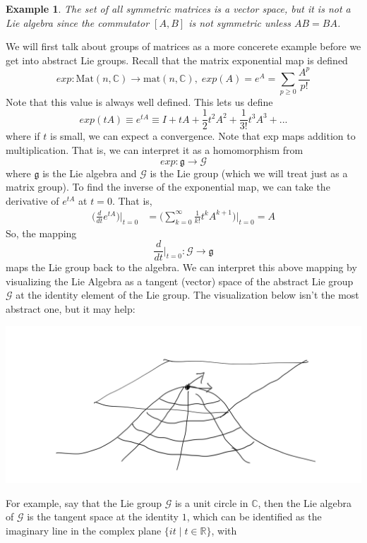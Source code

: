\documentclass{article}
\newtheorem{example}{Example}[section]
\theoremstyle{remark}
\theoremstyle{definition}
\begin{document}
\begin{example}
The set of all symmetric matrices is a vector space, but it is \textit{not} a Lie algebra since the commutator $[A,B]$ is not symmetric unless $A B = B A$. 
\end{example}

We will first talk about groups of matrices as a more concerete example before we get into abstract Lie groups. Recall that the matrix exponential map is defined
\[exp: \text{Mat}(n, \mathbb{C}) \longrightarrow \text{mat}(n, \mathbb{C}), \; exp(A) = e^A = \sum_{p \geq 0} \frac{A^p}{p!}\]
Note that this value is always well defined. This lets us define
\[exp(t A) \equiv e^{t A} \equiv I + tA + \frac{1}{2} t^2 A^2 + \frac{1}{3!} t^3 A^3 + ... \]
where if $t$ is small, we can expect a convergence. Note that exp maps addition to multiplication. That is, we can interpret it as a homomorphism from 
\[exp: \mathfrak{g} \longrightarrow \mathcal{G}\]
where $\mathfrak{g}$ is the Lie algebra and $\mathcal{G}$ is the Lie group (which we will treat just as a matrix group). To find the inverse of the exponential map, we can take the derivative of $e^{tA}$ at $t=0$. That is, 
\begin{align*}
    \bigg(\frac{d}{d t} e^{tA} \bigg) \bigg|_{t=0} & = \bigg(\sum_{k=0}^\infty \frac{1}{k!} t^k A^{k+1} \bigg) \bigg|_{t=0} = A
\end{align*}
So, the mapping
\[\frac{d}{dt} \bigg|_{t=0}: \mathcal{G} \longrightarrow \mathfrak{g}\]
maps the Lie group back to the algebra. We can interpret this above mapping by visualizing the Lie Algebra as a tangent (vector) space of the abstract Lie group $\mathcal{G}$ at the identity element of the Lie group. The visualization below isn't the most abstract one, but it may help:
\begin{center}
    \includegraphics[scale=0.2]{img/Lie_Algebra_Tangent_Space.PNG}
\end{center}
For example, say that the Lie group $\mathcal{G}$ is a unit circle in $\mathbb{C}$, then the Lie algebra of $\mathcal{G}$ is the tangent space at the identity $1$, which can be identified as the imaginary line in the complex plane $\{i t \; | \; t \in \mathbb{R}\}$, with 
\end{document}
